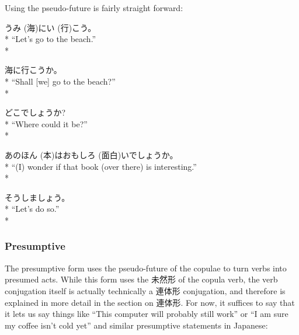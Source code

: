 \documentclass[11pt, b5paper, twoside, openright, onecolumn]{book}
\makeatletter
\newcommand*{\rubystack}[2]{{\relscale{0.5}%
  \begin{tabular}[b]{@{}c@{}}%
    {#1}\\%
   {\textscale{2}{#2}}%
  \end{tabular}}%
}
\DeclareRobustCommand*{\ruby}[2]{%
  \mbox{%
    \setlength{\parskip}{0ex}%
    \BeginAccSupp{method=pdfstringdef,ActualText={#1}}%
      \rubystack{\phantom{#2}}{#1}%
      \llap{%
        \rubystack{#2}{\phantom{#1}}%
      }%
    \EndAccSupp{}%
  }%
}
\renewcommand*{\ruby}[2]{#2 (#1)}%
\newenvironment{exampleblock}{
\setlength{\parindent}{0.6in}
\begin{minipage}[t]{\dimexpr\textwidth-\parindent}}
{\end{minipage}}
\makeatother
\begin{document}
Using the pseudo-future is fairly straight forward:

\vspace{0.4cm}
\begin{exampleblock}
\ruby{海}{うみ}に\ruby{行}{い}こう。 \\* 
“Let’s go to the beach.” \\* 
\end{exampleblock}
\vspace{0.2cm}

\begin{exampleblock}
海に行こうか。 \\* 
“Shall [we] go to the beach?” \\* 
\end{exampleblock}
\vspace{0.2cm}

\begin{exampleblock}
どこでしょうか? \\* 
“Where could it be?” \\* 
\end{exampleblock}
\vspace{0.2cm}

\begin{exampleblock}
あの\ruby{本}{ほん}は\ruby{面白}{おもしろ}いでしょうか。 \\* 
“(I) wonder if that book (over there) is interesting.” \\* 
\end{exampleblock}
\vspace{0.2cm}

\begin{exampleblock}
そうしましょう。 \\* 
“Let’s do so.” \\* 
\end{exampleblock}
\subsubsection{Presumptive}


The presumptive form uses the pseudo-future of the copulae to turn verbs into presumed acts. While this form uses the 未然形 of the copula verb‚ the verb conjugation itself is actually technically a 連体形 conjugation‚ and therefore is explained in more detail in the section on 連体形. For now‚ it suffices to say that it lets us say things like “This computer will probably still work” or “I am sure my coffee isn’t cold yet” and similar presumptive statements in Japanese:
\end{document}
